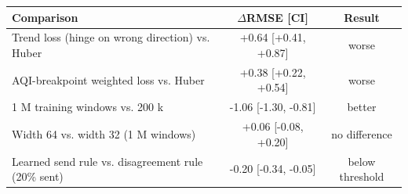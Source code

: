 \begin{tabular}{|p{4.0cm}|c|c|}
\hline
Comparison & $\Delta$RMSE [CI] & Result \\
\hline
Trend loss (hinge on wrong direction) vs. Huber & +0.64 [+0.41, +0.87] & worse \\
AQI-breakpoint weighted loss vs. Huber & +0.38 [+0.22, +0.54] & worse \\
1 M training windows vs. 200 k & -1.06 [-1.30, -0.81] & better \\
Width 64 vs. width 32 (1 M windows) & +0.06 [-0.08, +0.20] & no difference \\
Learned send rule vs. disagreement rule (20\% sent) & -0.20 [-0.34, -0.05] & below threshold \\
\hline
\end{tabular}
